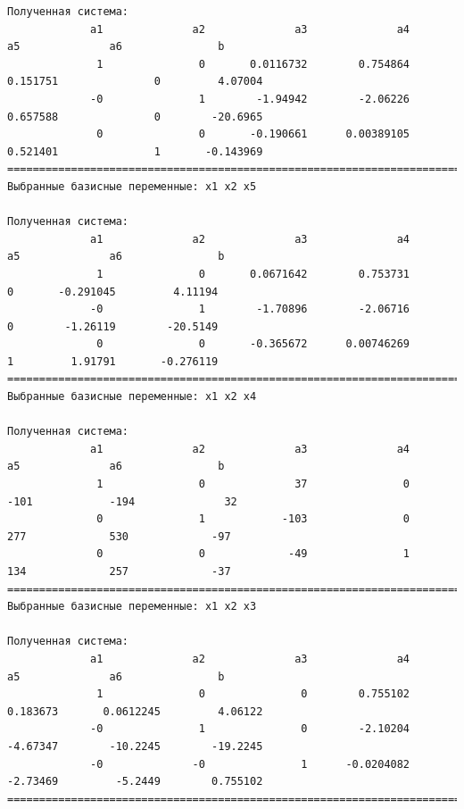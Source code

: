 \documentclass[a4paper,14pt]{extarticle}
\begin{document}
\begin{verbatim}
Полученная система:
             a1              a2              a3              a4              a5              a6               b
              1               0       0.0116732        0.754864        0.151751               0         4.07004
             -0               1        -1.94942        -2.06226        0.657588               0        -20.6965
              0               0       -0.190661      0.00389105        0.521401               1       -0.143969
==================================================================================================================
Выбранные базисные переменные: x1 x2 x5

Полученная система:
             a1              a2              a3              a4              a5              a6               b
              1               0       0.0671642        0.753731               0       -0.291045         4.11194
             -0               1        -1.70896        -2.06716               0        -1.26119        -20.5149
              0               0       -0.365672      0.00746269               1         1.91791       -0.276119
==================================================================================================================
Выбранные базисные переменные: x1 x2 x4

Полученная система:
             a1              a2              a3              a4              a5              a6               b
              1               0              37               0            -101            -194              32 
              0               1            -103               0             277             530             -97
              0               0             -49               1             134             257             -37
==================================================================================================================
Выбранные базисные переменные: x1 x2 x3

Полученная система:
             a1              a2              a3              a4              a5              a6               b
              1               0               0        0.755102        0.183673       0.0612245         4.06122
             -0               1               0        -2.10204        -4.67347        -10.2245        -19.2245
             -0              -0               1      -0.0204082        -2.73469         -5.2449        0.755102
==================================================================================================================
\end{verbatim}
\end{document}
